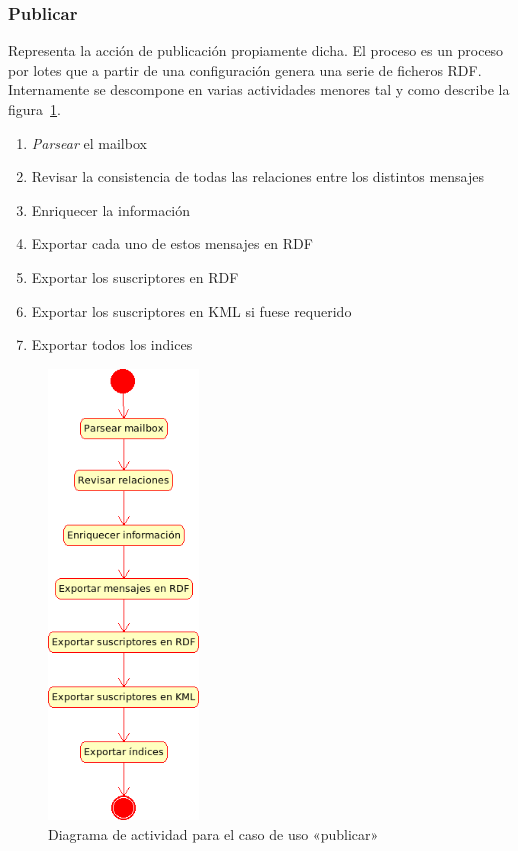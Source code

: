 \subsubsection{Publicar}

Representa la acción de publicación propiamente dicha. El proceso es un proceso por 
lotes que a partir de una configuración genera una serie de ficheros RDF. Internamente
se descompone en varias actividades menores tal y como describe la 
figura~\ref{fig:uml:publicar}.

\begin{enumerate}
 \item \emph{Parsear} el mailbox
 \item Revisar la consistencia de todas las relaciones entre los distintos mensajes
 \item Enriquecer la información
 \item Exportar cada uno de estos mensajes en RDF
 \item Exportar los suscriptores en RDF
 \item Exportar los suscriptores en KML si fuese requerido
 \item Exportar todos los indices
\end{enumerate}

\begin{figure}[H]
 	\centering
	\includegraphics[width=4cm]{images/uml/casos-uso/publicar.png}
	\caption{Diagrama de actividad para el caso de uso «publicar»}
	\label{fig:uml:publicar}
\end{figure}

